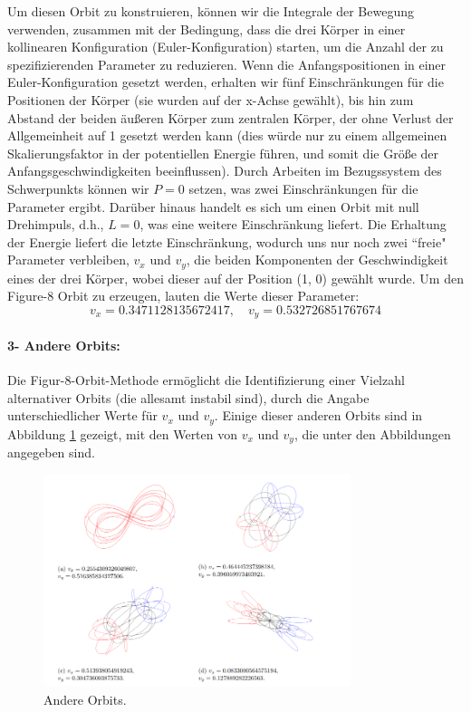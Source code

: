 \documentclass[a4paper,12pt,twoside]{article}
\begin{document}
Um diesen Orbit zu konstruieren, können wir die Integrale der Bewegung verwenden, 
zusammen mit der Bedingung, dass die drei Körper in einer kollinearen Konfiguration (Euler-Konfiguration) starten, um die Anzahl der zu spezifizierenden Parameter zu reduzieren. 
Wenn die Anfangspositionen in einer Euler-Konfiguration gesetzt werden, erhalten wir fünf Einschränkungen für die Positionen der Körper (sie wurden auf der x-Achse gewählt), bis hin zum Abstand der beiden äußeren Körper zum zentralen Körper, der ohne Verlust der Allgemeinheit auf 1 gesetzt werden kann (dies würde nur zu einem allgemeinen Skalierungsfaktor in der potentiellen Energie führen, und somit die Größe der Anfangsgeschwindigkeiten beeinflussen). 
Durch Arbeiten im Bezugssystem des Schwerpunkts können wir $P = 0$ setzen, was zwei Einschränkungen für die Parameter ergibt. Darüber hinaus handelt es sich um einen Orbit mit null Drehimpuls, d.h., $L = 0$, was eine weitere Einschränkung liefert. Die Erhaltung der Energie liefert die letzte Einschränkung, wodurch uns nur noch zwei ``freie" Parameter verbleiben, $v_x$ und $v_y$, die beiden Komponenten der Geschwindigkeit eines der drei Körper, wobei dieser auf der Position (1, 0) gewählt wurde. Um den Figure-8 Orbit zu erzeugen, lauten die Werte dieser Parameter:
\begin{equation}
	v_x = 0.3471128135672417, \quad v_y = 0.532726851767674
	\label{ref1}
\end{equation}


\paragraph{3- Andere Orbits: } 
Die Figur-8-Orbit-Methode ermöglicht die Identifizierung einer Vielzahl alternativer Orbits (die allesamt instabil sind), durch die Angabe unterschiedlicher Werte für $v_x$ und $v_y$.
Einige dieser anderen Orbits sind in Abbildung \ref{Abb:andereOrbits} gezeigt, mit den Werten von $v_x$ und $v_y$, die unter den Abbildungen angegeben sind.

\begin{figure}[H]
    \centering
    \includegraphics[width=0.8\textwidth]{AndereOrbits.png}
    \caption{Andere Orbits.}
    \label{Abb:andereOrbits}
\end{figure}
\end{document}
